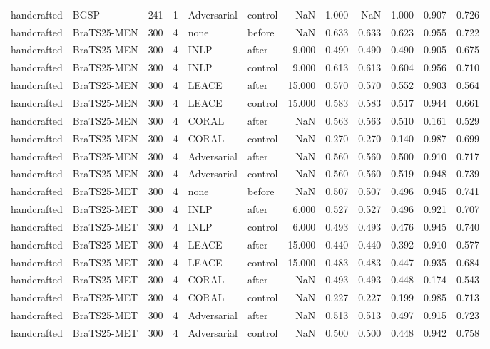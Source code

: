 \begin{tabular}{llrrllrrrrrr}
handcrafted & BGSP & 241 & 1 & Adversarial & control & NaN & 1.000 & NaN & 1.000 & 0.907 & 0.726 \\
handcrafted & BraTS25-MEN & 300 & 4 & none & before & NaN & 0.633 & 0.633 & 0.623 & 0.955 & 0.722 \\
handcrafted & BraTS25-MEN & 300 & 4 & INLP & after & 9.000 & 0.490 & 0.490 & 0.490 & 0.905 & 0.675 \\
handcrafted & BraTS25-MEN & 300 & 4 & INLP & control & 9.000 & 0.613 & 0.613 & 0.604 & 0.956 & 0.710 \\
handcrafted & BraTS25-MEN & 300 & 4 & LEACE & after & 15.000 & 0.570 & 0.570 & 0.552 & 0.903 & 0.564 \\
handcrafted & BraTS25-MEN & 300 & 4 & LEACE & control & 15.000 & 0.583 & 0.583 & 0.517 & 0.944 & 0.661 \\
handcrafted & BraTS25-MEN & 300 & 4 & CORAL & after & NaN & 0.563 & 0.563 & 0.510 & 0.161 & 0.529 \\
handcrafted & BraTS25-MEN & 300 & 4 & CORAL & control & NaN & 0.270 & 0.270 & 0.140 & 0.987 & 0.699 \\
handcrafted & BraTS25-MEN & 300 & 4 & Adversarial & after & NaN & 0.560 & 0.560 & 0.500 & 0.910 & 0.717 \\
handcrafted & BraTS25-MEN & 300 & 4 & Adversarial & control & NaN & 0.560 & 0.560 & 0.519 & 0.948 & 0.739 \\
handcrafted & BraTS25-MET & 300 & 4 & none & before & NaN & 0.507 & 0.507 & 0.496 & 0.945 & 0.741 \\
handcrafted & BraTS25-MET & 300 & 4 & INLP & after & 6.000 & 0.527 & 0.527 & 0.496 & 0.921 & 0.707 \\
handcrafted & BraTS25-MET & 300 & 4 & INLP & control & 6.000 & 0.493 & 0.493 & 0.476 & 0.945 & 0.740 \\
handcrafted & BraTS25-MET & 300 & 4 & LEACE & after & 15.000 & 0.440 & 0.440 & 0.392 & 0.910 & 0.577 \\
handcrafted & BraTS25-MET & 300 & 4 & LEACE & control & 15.000 & 0.483 & 0.483 & 0.447 & 0.935 & 0.684 \\
handcrafted & BraTS25-MET & 300 & 4 & CORAL & after & NaN & 0.493 & 0.493 & 0.448 & 0.174 & 0.543 \\
handcrafted & BraTS25-MET & 300 & 4 & CORAL & control & NaN & 0.227 & 0.227 & 0.199 & 0.985 & 0.713 \\
handcrafted & BraTS25-MET & 300 & 4 & Adversarial & after & NaN & 0.513 & 0.513 & 0.497 & 0.915 & 0.723 \\
handcrafted & BraTS25-MET & 300 & 4 & Adversarial & control & NaN & 0.500 & 0.500 & 0.448 & 0.942 & 0.758 \\

\end{tabular}
